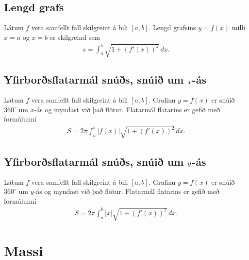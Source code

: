 \documentclass[a4paper,10pt,icelandic]{sphinxmanual}
\begin{document}
\subsection{Lengd grafs}
\label{kafli07:lengd-grafs}
Látum \(f\) vera samfellt fall skilgreint á bili \([a, b]\).
Lengd grafsins \(y=f(x)\) milli \(x=a\) og \(x=b\) er
skilgreind sem
\begin{equation*}
\begin{split}s=\int_a^b\sqrt{1+(f'(x))^2}\,dx.\end{split}
\end{equation*}

\subsection{Yfirborðsflatarmál snúðs, snúið um \protect\(x\protect\)-ás}
\label{kafli07:yfirborsflatarmal-snus-snui-um-as}\label{kafli07:index-7}
Látum \(f\) vera samfellt fall skilgreint á bili \([a, b]\).
Grafinu \(y=f(x)\) er snúið \(360^\circ\) um \(x\)-ás og
myndast við það flötur. Flatarmál flatarins er gefið með formúlunni
\begin{equation*}
\begin{split}S=2\pi\int_a^b|f(x)|\sqrt{1+(f'(x))^2}\,dx.\end{split}
\end{equation*}

\subsection{Yfirborðsflatarmál snúðs, snúið um \protect\(y\protect\)-ás}
\label{kafli07:id3}\label{kafli07:index-8}
Látum \(f\) vera samfellt fall skilgreint á bili \([a, b]\).
Grafinu \(y=f(x)\) er snúið \(360^\circ\) um \(y\)-ás og
myndast við það flötur. Flatarmál flatarins er gefið með formúlunni
\begin{equation*}
\begin{split}S=2\pi\int_a^b|x|\sqrt{1+(f'(x))^2}\,dx.\end{split}
\end{equation*}

\section{Massi}
\label{kafli07:index-9}\label{kafli07:massi}
\end{document}
